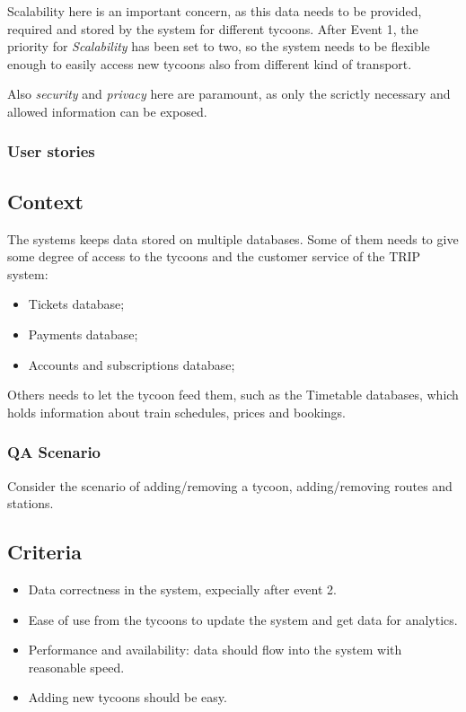 Scalability here is an important concern, as this data needs to be provided, required and stored by the system for different tycoons.
After Event 1, the priority for \textit{Scalability} has been set to two, so the system needs to be flexible enough to easily access new tycoons also from different kind of transport.

Also \textit{security} and \textit{privacy} here are paramount, as only the scrictly necessary and allowed information can be exposed.

\subsubsection*{User stories}

\subsection*{Context}
The systems keeps data stored on multiple databases. 
Some of them needs to give some degree of access to the tycoons and the customer service of the TRIP system:
\begin{itemize}
    \item Tickets database;
    \item Payments database;
    \item Accounts and subscriptions database;
\end{itemize}

Others needs to let the tycoon feed them, such as the Timetable databases, which holds information about train schedules,
prices and bookings.

\subsubsection*{QA Scenario} %
Consider the scenario of adding/removing a tycoon, adding/removing routes and stations.
\subsection*{Criteria}
\begin{itemize}
    \item Data correctness in the system, expecially after event 2.
    \item Ease of use from the tycoons to update the system and get data for analytics.
    \item Performance and availability: data should flow into the system with reasonable speed.
    \item Adding new tycoons should be easy.
\end{itemize}

